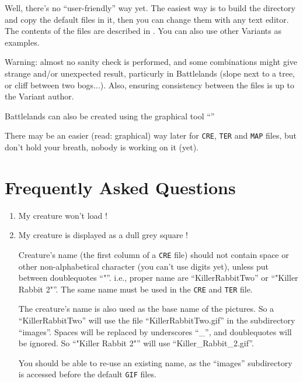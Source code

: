 \documentclass{article}
\begin{document}
Well, there's no ``user-friendly'' way yet. The easiest way is
to build the directory and copy the default files in it,
then you can change them with any text editor. The contents
of the files are described in
.
You can also use other Variants as examples.

Warning: almost no sanity check is performed, and some
combinations might give strange and/or unexpected result,
particurly in Battlelands (slope next to a tree, or
cliff between two bogs...). Also, ensuring consistency
between the files is up to the Variant author.

Battlelands can also be created using the graphical tool
``''

There may be an easier (read: graphical) way later for
\texttt{CRE}, \texttt{TER} and \texttt{MAP} files, but don't hold your breath, nobody
is working on it (yet).

\section{Frequently Asked Questions}

\begin{enumerate}

\item My creature won't load !
\item My creature is displayed as a dull grey square !

Creature's name (the first column of a \texttt{CRE} file) should not
contain space or other non-alphabetical character (you
can't use digits yet), unless put between doublequotes ``"''.
i.e., proper name are ``KillerRabbitTwo'' or ``"Killer Rabbit 2"''.
The same name must be used in the \texttt{CRE} and \texttt{TER} file.

The creature's name is also used as the base name
of the pictures. So a ``KillerRabbitTwo'' will use
the file ``KillerRabbitTwo.gif'' in the subdirectory
``images''. Spaces will be replaced by underscores ``\_'',
and doublequotes will be ignored. So ``"Killer Rabbit 2"''
will use ``Killer\_Rabbit\_2.gif''.

You should be able to re-use an existing name, as
the ``images'' subdirectory is accessed before the default
\texttt{GIF} files.

\end{enumerate}
\end{document}
